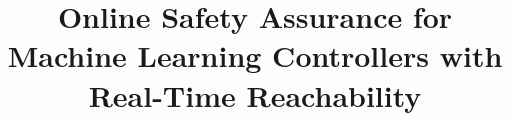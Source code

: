 \documentclass[manuscript,screen,review]{acmart}
\begin{document}
\title{Online Safety Assurance for Machine Learning Controllers with Real-Time Reachability}









\renewcommand{\shortauthors}{}
\end{document}
